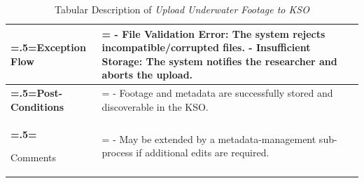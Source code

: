 \begin{table}[H]
\begin{tabularx}{\textwidth}{|>{\bfseries\hsize=.5\hsize\linewidth=\hsize}X|
    >{\hsize=1.5\hsize\linewidth=\hsize}X|}
    Exception Flow      & 
    - \textbf{File Validation Error:} The system rejects incompatible/corrupted files.\newline
    - \textbf{Insufficient Storage:} The system notifies the researcher and aborts the upload. \\ \hline
    
    Post-Conditions     & 
    - Footage and metadata are successfully stored and discoverable in the KSO. \\ \hline
    
    Comments            & 
    - May be extended by a metadata-management sub-process if additional edits are required. \\ \hline
    \end{tabularx}
    \caption{Tabular Description of \textit{Upload Underwater Footage to KSO} \label{Tab:UseCase1}}
    \end{table}

